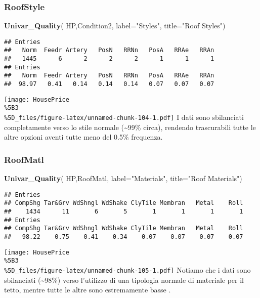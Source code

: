 \documentclass[
]{article}
\newenvironment{Shaded}{\begin{snugshade}}{\end{snugshade}}
\newcommand{\AttributeTok}[1]{\textcolor[rgb]{0.13,0.29,0.53}{#1}}
\newcommand{\FunctionTok}[1]{\textcolor[rgb]{0.13,0.29,0.53}{\textbf{#1}}}
\newcommand{\NormalTok}[1]{#1}
\newcommand{\StringTok}[1]{\textcolor[rgb]{0.31,0.60,0.02}{#1}}
\begin{document}
\subsubsection{RoofStyle}\label{roofstyle}

\begin{Shaded}
\begin{Highlighting}[]
\FunctionTok{Univar\_Quality}\NormalTok{(}
\NormalTok{  HP,Condition2,}
  \AttributeTok{label=}\StringTok{"Styles"}\NormalTok{,}
  \AttributeTok{title=}\StringTok{"Roof Styles"}\NormalTok{)}
\end{Highlighting}
\end{Shaded}

\begin{verbatim}
## Entries
##   Norm  Feedr Artery   PosN   RRNn   PosA   RRAe   RRAn 
##   1445      6      2      2      2      1      1      1 
## Entries
##   Norm  Feedr Artery   PosN   RRNn   PosA   RRAe   RRAn 
##  98.97   0.41   0.14   0.14   0.14   0.07   0.07   0.07
\end{verbatim}

\texttt{[image: HousePrice\\\%5B3\\\%5D\_files/figure-latex/unnamed-chunk-104-1.pdf]}
I dati sono sbilanciati completamente verso lo stile normale
(\textasciitilde99\% circa), rendendo trascurabili tutte le altre
opzioni aventi tutte meno del 0.5\% frequenza.

\subsubsection{RoofMatl}\label{roofmatl}

\begin{Shaded}
\begin{Highlighting}[]
\FunctionTok{Univar\_Quality}\NormalTok{(}
\NormalTok{  HP,RoofMatl, }
  \AttributeTok{label=}\StringTok{"Materials"}\NormalTok{,}
  \AttributeTok{title=}\StringTok{"Roof Materials"}\NormalTok{)}
\end{Highlighting}
\end{Shaded}

\begin{verbatim}
## Entries
## CompShg Tar&Grv WdShngl WdShake ClyTile Membran   Metal    Roll 
##    1434      11       6       5       1       1       1       1 
## Entries
## CompShg Tar&Grv WdShngl WdShake ClyTile Membran   Metal    Roll 
##   98.22    0.75    0.41    0.34    0.07    0.07    0.07    0.07
\end{verbatim}

\texttt{[image: HousePrice\\\%5B3\\\%5D\_files/figure-latex/unnamed-chunk-105-1.pdf]}
Notiamo che i dati sono sbilanciati (\textasciitilde98\%) verso
l'utilizzo di una tipologia normale di materiale per il tetto, mentre
tutte le altre sono estremamente basse .
\end{document}
